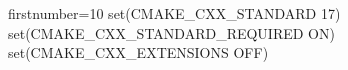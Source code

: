 \begin{cmakecode*}{firstnumber=10}
set(CMAKE_CXX_STANDARD 17)
set(CMAKE_CXX_STANDARD_REQUIRED ON)
set(CMAKE_CXX_EXTENSIONS OFF)
\end{cmakecode*}
